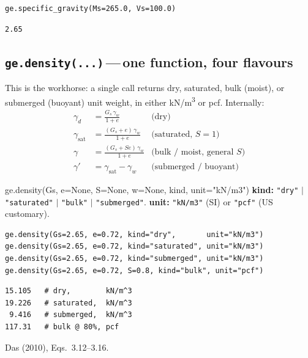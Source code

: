 \documentclass[11pt,a4paper,openany]{book}
\newcommand{\gammaw}{\gamma_w}
\begin{document}
\begin{lstlisting}
ge.specific_gravity(Ms=265.0, Vs=100.0)
\end{lstlisting}
\begin{lstlisting}[style=output]
2.65
\end{lstlisting}

\subsection{\texttt{ge.density(...)}\,---\,one function, four flavours}

This is the workhorse: a single call returns dry, saturated,
bulk (moist), or submerged (buoyant) unit weight, in either
kN/m\textsuperscript{3} or pcf. Internally:
\begin{align}
\gamma_d   &= \frac{G_s\,\gammaw}{1+e}                  &\text{(dry)} \label{eq:gamma_d}\\
\gamma_{\text{sat}} &= \frac{(G_s + e)\,\gammaw}{1+e}   &\text{(saturated, $S=1$)} \label{eq:gamma_sat}\\
\gamma     &= \frac{(G_s + Se)\,\gammaw}{1+e}           &\text{(bulk / moist, general $S$)} \label{eq:gamma_b}\\
\gamma'    &= \gamma_{\text{sat}} - \gammaw             &\text{(submerged / buoyant)} \label{eq:gamma_sub}
\end{align}

\begin{funcbox}{ge.density(Gs, e=None, S=None, w=None, kind, unit="kN/m3")}
\textbf{kind:} \texttt{"dry"} $|$ \texttt{"saturated"} $|$
\texttt{"bulk"} $|$ \texttt{"submerged"}.
\textbf{unit:} \texttt{"kN/m3"} (SI) or \texttt{"pcf"} (US customary).
\end{funcbox}

\begin{lstlisting}
ge.density(Gs=2.65, e=0.72, kind="dry",       unit="kN/m3")
ge.density(Gs=2.65, e=0.72, kind="saturated", unit="kN/m3")
ge.density(Gs=2.65, e=0.72, kind="submerged", unit="kN/m3")
ge.density(Gs=2.65, e=0.72, S=0.8, kind="bulk", unit="pcf")
\end{lstlisting}
\begin{lstlisting}[style=output]
15.105   # dry,        kN/m^3
19.226   # saturated,  kN/m^3
 9.416   # submerged,  kN/m^3
117.31   # bulk @ 80%, pcf
\end{lstlisting}

\begin{refbox}
Das (2010), Eqs.~3.12--3.16.
\end{refbox}
\end{document}
